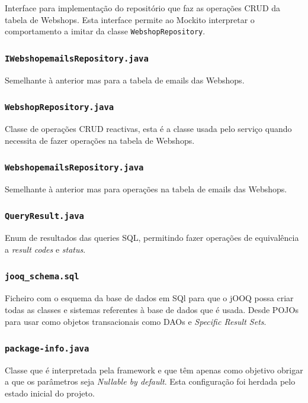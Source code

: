 Interface para implementação do repositório que faz as operações CRUD da tabela de Webshops. Esta interface permite ao Mockito interpretar o comportamento a imitar da classe \texttt{WebshopRepository}.

\subsubsection*{\texttt{IWebshopemailsRepository.java}}

Semelhante à anterior mas para a tabela de emails das Webshops.

\subsubsection*{\texttt{WebshopRepository.java}}

Classe de operações CRUD reactivas, esta é a classe usada pelo serviço quando necessita de fazer operações na tabela de Webshops.

\subsubsection*{\texttt{WebshopemailsRepository.java}}

Semelhante à anterior mas para operações na tabela de emails das Webshops.

\subsubsection*{\texttt{QueryResult.java}}

Enum de resultados das queries SQL, permitindo fazer operações de equivalência a \textit{result codes} e \textit{status}.

\subsubsection*{\texttt{jooq\_schema.sql}}

Ficheiro com o esquema da base de dados em SQl para que o jOOQ possa criar todas as classes e sistemas referentes à base de dados que é usada. Desde POJOs para usar como objetos transacionais como DAOs e \textit{Specific Result Sets}.

\subsubsection*{\texttt{package-info.java}}

Classe que é interpretada pela framework e que têm apenas como objetivo obrigar a que os parâmetros seja \textit{Nullable by default}. Esta configuração foi herdada pelo estado inicial do projeto.

